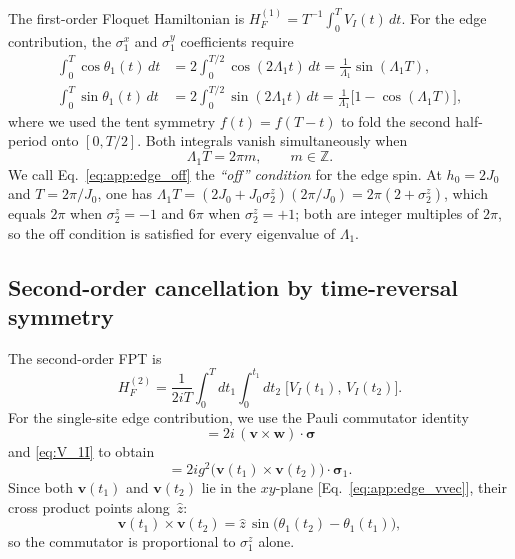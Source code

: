 \documentclass[aps,prb,reprint,twocolumn,amsmath,amssymb,citeautoscript]{revtex4-2}
\begin{document}
The first-order Floquet Hamiltonian is
$H_F^{(1)}=T^{-1}\!\int_0^T V_I(t)\,dt$.
For the edge contribution, the $\sigma_1^x$ and $\sigma_1^y$
coefficients require
\begin{align}
\int_0^T\!\cos\theta_1(t)\,dt
&=2\!\int_0^{T/2}\!\cos(2\Lambda_1 t)\,dt
=\frac{1}{\Lambda_1}\sin(\Lambda_1 T),
\label{eq:app:edge_cos_int}\\[4pt]
\int_0^T\!\sin\theta_1(t)\,dt
&=2\!\int_0^{T/2}\!\sin(2\Lambda_1 t)\,dt
=\frac{1}{\Lambda_1}\bigl[1-\cos(\Lambda_1 T)\bigr],
\label{eq:app:edge_sin_int}
\end{align}
where we used the tent symmetry $f(t)=f(T-t)$ to fold the
second half-period onto $[0,T/2]$.
Both integrals vanish simultaneously when
\begin{equation}
\Lambda_1 T=2\pi m,\qquad m\in\mathbb{Z}.
\label{eq:app:edge_off}
\end{equation}
We call Eq.~\eqref{eq:app:edge_off} the \textit{``off'' condition}
for the edge spin.
At $h_0=2J_0$ and $T=2\pi/J_0$, one has
$\Lambda_1 T=(2J_0+J_0\sigma_2^z)(2\pi/J_0)
=2\pi(2+\sigma_2^z)$,
which equals $2\pi$ when $\sigma_2^z=-1$ and $6\pi$ when
$\sigma_2^z=+1$; both are integer multiples of $2\pi$, so the
off condition is satisfied for every eigenvalue of $\Lambda_1$.


\subsection{Second-order cancellation by time-reversal symmetry}
\label{app:edge:second_order}

The second-order FPT is
\begin{equation}
H_F^{(2)}
=\frac{1}{2iT}\int_0^T\!dt_1\int_0^{t_1}\!dt_2\;
\bigl[V_I(t_1),\,V_I(t_2)\bigr].
\label{eq:app:edge_HF2_formula}
\end{equation}
For the single-site edge contribution, we use the Pauli commutator identity
\begin{equation}
[\mathbf{v}\cdot\boldsymbol{\sigma},\;
\mathbf{w}\cdot\boldsymbol{\sigma}]
=2i\,(\mathbf{v}\times\mathbf{w})\cdot\boldsymbol{\sigma}
\label{eq:app:Pauli_comm}
\end{equation}
and \eqref{eq:V_1I} to obtain
\begin{equation}
[V_{1,I}(t_1),\,V_{1,I}(t_2)]
=2ig^2\bigl(\mathbf{v}(t_1)\times\mathbf{v}(t_2)\bigr)
\cdot\boldsymbol{\sigma}_1.
\label{eq:app:edge_comm12}
\end{equation}
Since both $\mathbf{v}(t_1)$ and $\mathbf{v}(t_2)$ lie in the
$xy$-plane [Eq.~\eqref{eq:app:edge_vvec}], their cross product
points along~$\hat{z}$:
\begin{equation}
\mathbf{v}(t_1)\times\mathbf{v}(t_2)
=\hat{z}\,\sin\!\bigl(\theta_1(t_2)-\theta_1(t_1)\bigr),
\label{eq:app:edge_cross12}
\end{equation}
so the commutator is proportional to $\sigma_1^z$ alone.
\end{document}
